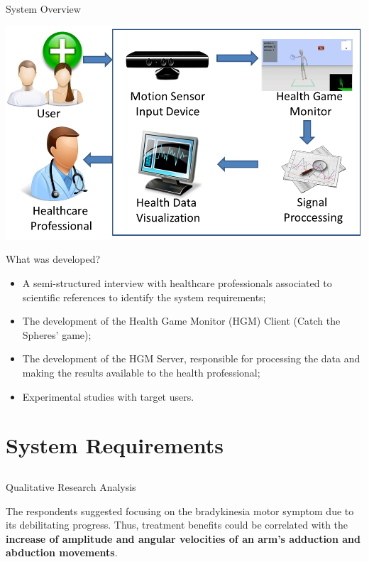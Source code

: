 \documentclass{beamer}
\begin{document}
\begin{frame}{System Overview}
		 \begin{block}{}
			\begin{center}
				\includegraphics[height=2.2 in]{img/systemoverview3.png}
			\end{center}
		 \end{block}
\end{frame}


\begin{frame}{What was developed?}
    \begin{block}{}
        \begin{itemize}[<+->]
            \item  A semi-structured interview with healthcare professionals associated to scientific references to identify the system requirements;
            \item The development of the Health Game Monitor (HGM) Client (Catch the Spheres' game);
            \item The development of the HGM Server, responsible for processing the data and making the results available to the health professional;
						\item Experimental studies with target users.
        \end{itemize}
    \end{block}
\end{frame}

\section{System Requirements}
\subsection{}
\begin{frame}{Qualitative Research Analysis} 
    \begin{block}{}					
		The respondents suggested focusing on the bradykinesia motor symptom due to its debilitating progress. Thus, treatment benefits could be correlated with the \textbf{increase of amplitude and angular velocities of an arm's adduction and abduction movements}.
    \end{block}
\end{frame} 
\end{document}

